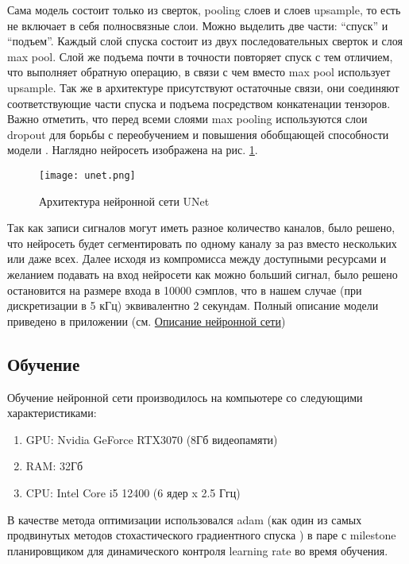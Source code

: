 Сама модель состоит только из сверток, pooling слоев и слоев upsample, то есть
не включает в себя полносвязные слои. Можно выделить две части: ``спуск'' и
``подъем''. Каждый слой спуска состоит из двух последовательных сверток и слоя
max pool. Слой же подъема почти в точности повторяет спуск с тем отличием, что
выполняет обратную операцию, в связи с чем вместо max pool использует upsample.
Так же в архитектуре присутствуют остаточные связи, они соединяют
соответствующие части спуска и подъема посредством конкатенации тензоров. Важно
отметить, что перед всеми слоями max pooling используются слои dropout для
борьбы с переобучением и повышения обобщающей способности модели
\cite{cnn-dropout}. Наглядно нейросеть изображена на рис. \ref{fig:unet}.

\begin{figure}[!htb]
	\centering
	\caption{Архитектура нейронной сети UNet}
	\texttt{[image: unet.png]}
	\label{fig:unet}
\end{figure}

Так как записи сигналов могут иметь разное количество каналов, было решено, что
нейросеть будет сегментировать по одному каналу за раз вместо нескольких или
даже всех. Далее исходя из компромисса между доступными ресурсами и желанием
подавать на вход нейросети как можно больший сигнал, было решено остановится на
размере входа в 10000 сэмплов, что в нашем случае (при дискретизации в 5 кГц)
эквивалентно 2 секундам. Полный описание модели приведено в приложении (см.
\hyperref[lst:unet]{Описание нейронной сети})

\subsection{Обучение}

Обучение нейронной сети производилось на компьютере со следующими характеристиками:

\begin{enumerate}
	\item GPU: Nvidia GeForce RTX3070 (8Гб видеопамяти)
	\item RAM: 32Гб
	\item CPU: Intel Core i5 12400 (6 ядер x 2.5 Ггц)
\end{enumerate}

В качестве метода оптимизации использовался adam (как один из самых продвинутых
методов стохастического градиентного спуска \cite{adam}) в паре с milestone
планировщиком для динамического контроля learning rate во время обучения.

